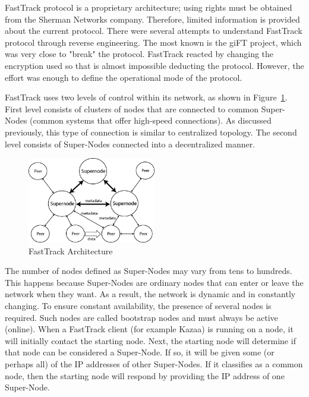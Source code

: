 FastTrack protocol is a proprietary architecture; using rights must be obtained
from the Sherman Networks company. Therefore, limited information is provided
about the current protocol. There were several attempts to understand
FastTrack protocol through reverse engineering. The most known is the giFT
project, which was very close to "break" the protocol. FastTrack reacted by
changing the encryption used so that is almost impossible deducting the
protocol. However, the effort was enough to define the operational mode of
the protocol.

FastTrack uses two levels of control within its network, as shown in
Figure~\ref{fig:p2p-systems:fasttrack}. First level consists of clusters of
nodes that are connected to common Super-Nodes (common systems that offer
high-speed connections). As discussed previously, this type of connection is
similar to centralized topology. The second level consists of Super-Nodes
connected into a decentralized manner.

\begin{figure}
  \centering
  \includegraphics[width=0.5\textwidth]{src/img/p2p-systems/fasttrack}
  \caption{FastTrack Architecture}
  \label{fig:p2p-systems:fasttrack}
\end{figure}

The number of nodes defined as Super-Nodes may vary from tens to hundreds.
This happens because Super-Nodes are ordinary nodes that can enter or leave the
network when they want. As a result, the network is dynamic and in constantly
changing. To ensure constant availability, the presence of several nodes is
required. Such nodes are called bootstrap nodes and must always be active
(online). When a FastTrack client (for example Kazaa) is running on a node, it
will initially contact the starting node. Next, the starting node will
determine if that node can be considered a Super-Node. If so, it will be given
some (or perhaps all) of the IP addresses of other Super-Nodes. If it
classifies as a common node, then the starting node will respond by providing
the IP address of one Super-Node.

